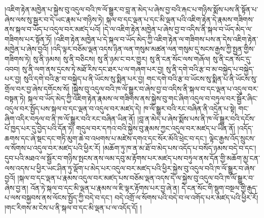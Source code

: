 །འཇིག་རྟེན་མཁྱེན་པ་སྐྱེས་བུ་འདུལ་བའི་ཁ་ལོ་སྒྱུར་བ་བླ་ན་མེད་པ་ཞེས་བྱ་བའི་རྐང་པ་གཉིས་སྨོས་པས་ནི་སྟོན་པ་ཞེས་ལས་སུ་སྦྱར་བ་དེ་ཡང་རྣམ་པ་གཉིས་ཏེ། སྐལ་བ་དང་ལྡན་པ་དང་མི་ལྡན་པའི་འཇིག་རྟེན་དེ་རྣམས་གཟིགས་ནས་སྐལ་བ་ཡོད་པ་འདུལ་བར་མཛད་པའོ། །དེ་ལ་འཇིག་རྟེན་མཁྱེན་པ་ཞེས་བྱ་བ་འདིས་ནི་སྐལ་བ་ཡོད་མེད་ལ་གཟིགས་པར་སྟོན་ཏོ། །འཇིག་རྟེན་མཁྱེན་པ་དེ་སྐལ་བ་ཡོད་མེད་ཀྱི་འཇིག་རྟེན་ལ་གཟིགས་པས་ན་དེས་འཇིག་རྟེན་མཁྱེན་པ་ཞེས་བྱའོ། །འདི་ལྟར་བཅོམ་ལྡན་འདས་ཉིན་ལན་གསུམ་མཚན་ལན་གསུམ་དུ་སངས་རྒྱས་ཀྱི་སྤྱན་གྱིས་གཟིགས་ཏེ། སུ་ནི་ཉམས། སུ་ནི་བཅིངས། སུ་ནི་ཉམ་ང་བར་གྱུར། སུ་ནི་ངན་སོང་ལས་གཞོལ། སུ་ནི་ངན་སོང་དུ་འབབ། སུ་ནི་ལག་ནས་དྲངས་ཏེ་མཐོ་རིས་དང་ཐར་པ་ལ་གཞག་པར་བྱ། སུ་ནི་དགེ་བའི་རྩ་བ་མ་བསྐྱེད་པ་བསྐྱེད་པར་བྱ། སུའི་དགེ་བའི་རྩ་བ་བསྐྱེད་པ་ནི་ཡོངས་སུ་སྨིན་པར་བྱ། གང་དགེ་བའི་རྩ་བ་ཡོངས་སུ་སྨིན་པ་ནི་ཡོངས་སུ་གྲོལ་བར་བྱ་ཞེས་དགོངས་སོ། །སྐྱེས་བུ་འདུལ་བའི་ཁ་ལོ་སྒྱུར་བ་ཞེས་བྱ་བ་འདིས་ནི་སྐལ་བ་དང་ལྡན་པ་འདུལ་བར་བསྟན་ཏེ། སྐལ་བ་ཡོད་མེད་ཀྱི་འཇིག་རྟེན་རྣམས་ལ་གཟིགས་ནས་སྐྱེས་བུ་གང་ཞིག་འདུལ་བ་བཏུལ་བར་སྦྱོར་ཞིང་འདུལ་བར་སྤྱོད་པས་སྐལ་བ་དང་ལྡན་བ་འདུལ་བར་མཛད་དེ། ཁ་ལོ་སྒྱུར་བའི་རང་བཞིན་ནི་འདྲེན་པ་སྟེ། གང་ཞིག་འདིར་བཏུལ་བ་ནི་ཁ་ལོ་སྒྱུར་བའི་རང་བཞིན་ཡིན་ནོ། །བླ་ན་མེད་པ་ཞེས་སྨོས་པས་ནི་ཁ་ལོ་སྒྱུར་བའི་དངོས་པོ་ཁྱད་པར་དུ་བྱེད་པའི་དོན་ཏེ། གདུལ་བར་དཀའ་བའི་སྐྱེས་བུ་རྣམས་ཀྱང་འདུལ་བར་མཛད་པ་ཡིན་ནོ། །འདོད་ཆགས་དང་ཞེ་སྡང་དང་གཏི་མུག་ཆེ་བ་འཕགས་པ་མཛེས་དགའ་དང་སོར་མོའི་ཕྲེང་བ་དང་། ལྟེང་རྒྱས་འོད་སྲུངས་ལ་སོགས་པ་འདུལ་བར་མཛད་པའི་ཕྱིར་རོ། །མཆོག་ཏུ་ཁ་ན་མ་ཐོ་བ་མེད་པས་འདོད་པ་བསོད་ཉམས་བདེ་བ་དང་། དུབ་པའི་མཐའ་ལ་སྦྱོར་བ་གཉིས་སྤངས་ནས་ལམ་དབུ་མ་རྟོགས་པར་མཛད་པས་བཏུལ་ནས་དོན་གྱི་མཆོག་མྱ་ངན་ལས་འདས་པ་ཕྱིར་ཡང་ཤིན་ཏུ་ལྡོག་པ་མེད་པར་འདུལ་བར་མཛད་པའི་ཕྱིར་སྐྱེས་བུ་འདུལ་བའི་ཁ་ལོ་སྒྱུར་བ་ཞེས་བྱའོ། །སྐལ་བ་དང་ལྡན་པ་རྣམས་འདུལ་བར་མཛད་པས་བཅོམ་ལྡན་འདས་དེ་ལ་སྐྱེས་བུ་འདུལ་བའི་ཁ་ལོ་སྒྱུར་བ་ཞེས་བྱ་ན། འོན་ཏེ་སྐལ་བ་དང་མི་ལྡན་པ་རྣམས་ལ་ཇི་ལྟར་རྟོགས་པར་བྱ་ཞེ་ན། དེ་ངན་སོང་གི་སྡུག་བསྔལ་གྱི་རྒུད་པ་ལས་བསྐྱབས་ནས་ལོངས་སྤྱོད་ཀྱི་བདེ་བ་དང་། བདེ་འགྲོ་ལ་སོགས་པའི་བདེ་བ་ལ་འགོད་པར་མཛད་པའི་ཕྱིར་རོ། །གང་རིགས་མ་ངེས་པ་ནི་སྐལ་བ་དང་མི་ལྡན་པ་ལ་འདོད་དོ། །
